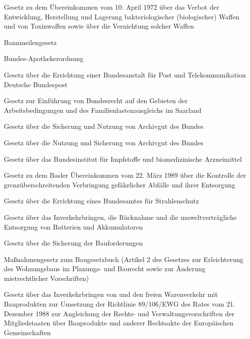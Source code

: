 \item[{BaktWaffVernÜbkG}] Gesetz zu dem Übereinkommen vom 10. April 1972 über das Verbot der Entwicklung, Herstellung und Lagerung bakteriologischer (biologischer) Waffen und von Toxinwaffen sowie über die Vernichtung solcher Waffen

\item[{BannMG}] Bannmeilengesetz

\item[{BApO}] Bundes-Apothekerordnung

\item[{BAPostG}] Gesetz über die Errichtung einer Bundesanstalt für Post und Telekommunikation Deutsche Bundespost

\item[{BArbRSaarEG}] Gesetz zur Einführung von Bundesrecht auf den Gebieten der Arbeitsbedingungen und des Familienlastenausgleichs im Saarland

\item[{BArchG}] Gesetz über die Sicherung und Nutzung von Archivgut des Bundes

\item[{BArchG-2017}] Gesetz über die Nutzung und Sicherung von Archivgut des Bundes

\item[{BASIG}] Gesetz über das Bundesinstitut für Impfstoffe und biomedizinische Arzneimittel

\item[{BaslÜbkG}] Gesetz zu dem Basler Übereinkommen vom 22. März 1989 über die Kontrolle der grenzüberschreitenden Verbringung gefährlicher Abfälle und ihrer Entsorgung

\item[{BAStrlSchG}] Gesetz über die Errichtung eines Bundesamtes für Strahlenschutz

\item[{BattG}] Gesetz über das Inverkehrbringen, die Rücknahme und die umweltverträgliche Entsorgung von Batterien und Akkumulatoren

\item[{BauFordSiG}] Gesetz über die Sicherung der Bauforderungen

\item[{BauGBMaßnG}] Maßnahmengesetz zum Baugesetzbuch (Artikel 2 des Gesetzes zur Erleichterung des Wohnungsbaus im Planungs- und Baurecht sowie zur Änderung mietrechtlicher Vorschriften)

\item[{BauPG}] Gesetz über das Inverkehrbringen von und den freien Warenverkehr mit Bauprodukten zur Umsetzung der Richtlinie 89/106/EWG des Rates vom 21. Dezember 1988 zur Angleichung der Rechts- und Verwaltungsvorschriften der Mitgliedstaaten über Bauprodukte und anderer Rechtsakte der Europäischen Gemeinschaften

